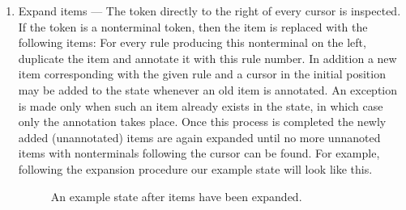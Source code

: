 \documentclass[a4paper,11pt]{article}
\begin{document}
\begin{enumerate}
\item Expand items --- The token directly to the right of every cursor is inspected. 
If the token is a nonterminal token, then the item is replaced with the following items: For every rule producing this nonterminal on the left, duplicate the item and annotate it with this rule number.
In addition a new item corresponding with the given rule and a cursor in the initial position may be added to the state whenever an old item is annotated. 
An exception is made only when such an item already exists in the state, in which case only the annotation takes place.
Once this process is completed the newly added (unannotated) items are again expanded until no more unnanoted items with nonterminals following the cursor can be found. 
For example, following the expansion procedure our example state will look like this.

\begin{figure}[!ht]
\begin{center}
\caption{An example state after items have been expanded.}
\end{center}
\end{figure}


\end{enumerate}
\end{document}

